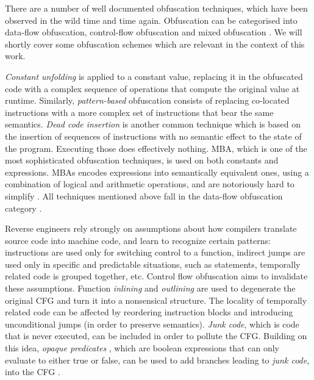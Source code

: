 There are a number of well documented obfuscation techniques, which have been observed in the wild time and time again. Obfuscation can be categorised into data-flow obfuscation, control-flow obfuscation and mixed obfuscation \cite{dang2014practical}. We will shortly cover some obfuscation schemes which are relevant in the context of this work.

\emph{Constant unfolding} is applied to a constant value, replacing it in the obfuscated code with a complex sequence of operations that compute the original value at runtime. Similarly, \emph{pattern-based} obfuscation consists of replacing co-located instructions with a more complex set of instructions that bear the same semantics. \emph{Dead code insertion} is another common technique which is based on the insertion of sequences of instructions with no semantic effect to the state of the program. Executing those does effectively nothing. \gls{MBA}, which is one of the most sophisticated obfuscation techniques, is used on both constants and expressions. \glspl{MBA} encodes expressions into semantically equivalent ones, using a combination of logical and arithmetic operations, and are notoriously hard to simplify \cite{zhou2007} \cite{mba_deobf}. All techniques mentioned above fall in the data-flow obfuscation category \cite{dang2014practical}.

Reverse engineers rely strongly on assumptions about how compilers translate source code into machine code, and learn to recognize certain patterns:  instructions are used only for switching control to a function, indirect jumps are used only in specific and predictable situations, such as  statements, temporally related code is grouped together, etc. Control flow obfuscation aims to invalidate these assumptions. Function \emph{inlining} and \emph{outlining} are used to degenerate the original \gls{CFG} and turn it into a nonsensical structure. The locality of temporally related code can be affected by reordering instruction blocks and introducing unconditional jumps (in order to preserve semantics). \emph{Junk code}, which is code that is never executed, can be included in order to pollute the \gls{CFG}. Building on this idea, \emph{opaque predicates} \cite{collberg1997taxonomy}, which are boolean expressions that can only evaluate to either true or false, can be used to add branches leading to \emph{junk code}, into the \gls{CFG} \cite{dang2014practical}.

